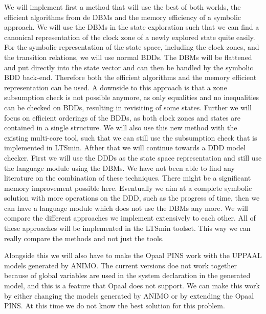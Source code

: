 We will implement first a method that will use the best of both worlds, the efficient algorithms from de DBMs and the memory efficiency of a symbolic approach. We will use the DBMs in the state exploration such that we can find a canonical representation of the clock zone of a newly explored state quite easily. For the symbolic representation of the state space, including the clock zones, and the transition relations, we will use normal BDDs. The DBMs will be flattened and put directly into the state vector and can then be handled by the symbolic BDD back-end. Therefore both the efficient algorithms and the memory efficient representation can be used. A downside to this approach is that a zone subsumption check is not possible anymore, as only equalities and no inequalities can be checked on BDDs, resulting in revisiting of some states. Further we will focus on efficient orderings of the BDDs, as both clock zones and states are contained in a single structure. We will also use this new method with the existing multi-core tool, such that we can still use the subsumption check that is implemented in LTSmin. Afther that we will continue towards a DDD model checker. First we will use the DDDs as the state space representation and still use the language module using the DBMs. We have not been able to find any literature on the combination of these techniques. There might be a significant memory improvement possible here. Eventually we aim at a complete symbolic solution with more operations on the DDD, such as the progress of time, then we can have a language module which does not use the DBMs any more. We will compare the different approaches we implement extensively to each other. All of these approaches will be implemented in the LTSmin toolset. This way we can really compare the methods and not just the tools.

Alongside this we will also have to make the Opaal PINS work with the UPPAAL models generated by ANIMO. The current versions doe not work together because of global variables are used in the system declaration in the generated model, and this is a feature that Opaal does not support. We can make this work by either changing the models generated by ANIMO or by extending the Opaal PINS. At this time we do not know the best solution for this problem.


